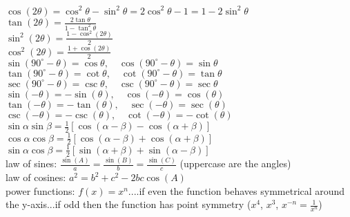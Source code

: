 \documentclass{article}
\begin{document}
$ \cos(2\theta) = \cos^2 \theta - \sin^2 \theta = 2\cos^2 \theta - 1 = 1 - 2\sin^2 \theta $\\

$ \tan(2\theta) = \frac{2\tan \theta}{1 - \tan^2 \theta} $\\

$ \sin^2(2\theta) = \frac{1 - \cos^2(2\theta)}{2} $\\

$ \cos^2(2\theta) = \frac{1 + \cos(2\theta)}{2} $\\

$ \sin(90^\circ - \theta) = \cos \theta, \quad \cos(90^\circ - \theta) = \sin \theta $\\

$ \tan(90^\circ - \theta) = \cot \theta, \quad \cot(90^\circ - \theta) = \tan \theta $\\

$ \sec(90^\circ - \theta) = \csc \theta, \quad \csc(90^\circ - \theta) = \sec \theta $\\

$ \sin(-\theta) = -\sin(\theta), \quad \cos(-\theta) = \cos(\theta) $\\

$ \tan(-\theta) = -\tan(\theta), \quad \sec(-\theta) = \sec(\theta) $\\

$ \csc(-\theta) = -\csc(\theta), \quad \cot(-\theta) = -\cot(\theta) $\\

$ \sin \alpha \sin \beta = \frac{1}{2} [\cos(\alpha - \beta) - \cos(\alpha + \beta)] $\\

$ \cos \alpha \cos \beta = \frac{1}{2} [\cos(\alpha - \beta) + \cos(\alpha + \beta)] $\\

$ \sin \alpha \cos \beta = \frac{1}{2} [\sin(\alpha + \beta) + \sin(\alpha - \beta)] $\\

law of sines: $ \frac{\sin(A)}{a} = \frac{\sin(B)}{b} = \frac{\sin(C)}{c} $ (uppercase are the angles)\\

law of cosines: $ a^2 = b^2+c^2 - 2bc\cos(A) $\\

power functions: $f(x) = x^n$....if even the function behaves symmetrical around the y-axis...if odd then the function has point symmetry ($x^4$, $x^3$, $x^{-n} = \frac{1}{x^n}$)\\
\end{document}

